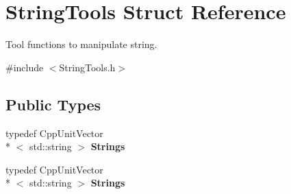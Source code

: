 \hypertarget{struct_string_tools}{\section{String\+Tools Struct Reference}
\label{struct_string_tools}
}


Tool functions to manipulate string.  




{\ttfamily \#include $<$String\+Tools.\+h$>$}

\subsection*{Public Types}
\begin{DoxyCompactItemize}
\item 
\hypertarget{struct_string_tools_ab01d065d80c39015955e9f765cd19921}{typedef Cpp\+Unit\+Vector\\*
$<$ std\+::string $>$ {\bfseries Strings}}\label{struct_string_tools_ab01d065d80c39015955e9f765cd19921}

\item 
\hypertarget{struct_string_tools_ab01d065d80c39015955e9f765cd19921}{typedef Cpp\+Unit\+Vector\\*
$<$ std\+::string $>$ {\bfseries Strings}}\label{struct_string_tools_ab01d065d80c39015955e9f765cd19921}

\end{DoxyCompactItemize}
